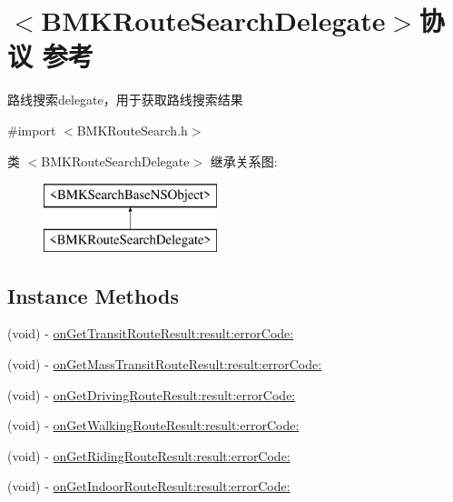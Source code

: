 \hypertarget{protocol_b_m_k_route_search_delegate-p}{}\section{$<$B\+M\+K\+Route\+Search\+Delegate$>$协议 参考}
\label{protocol_b_m_k_route_search_delegate-p}


路线搜索delegate，用于获取路线搜索结果  




{\ttfamily \#import $<$B\+M\+K\+Route\+Search.\+h$>$}

类 $<$B\+M\+K\+Route\+Search\+Delegate$>$ 继承关系图\+:\begin{figure}[H]
\begin{center}
\leavevmode
\includegraphics[height=2.000000cm]{protocol_b_m_k_route_search_delegate-p}
\end{center}
\end{figure}
\subsection*{Instance Methods}
\begin{DoxyCompactItemize}
\item 
(void) -\/ \hyperlink{protocol_b_m_k_route_search_delegate-p_adc734b9f771f0a2f600e0dc9da42fc9b}{on\+Get\+Transit\+Route\+Result\+:result\+:error\+Code\+:}
\item 
(void) -\/ \hyperlink{protocol_b_m_k_route_search_delegate-p_aff740d8b95d84e1e66d7bbf52e7514c7}{on\+Get\+Mass\+Transit\+Route\+Result\+:result\+:error\+Code\+:}
\item 
(void) -\/ \hyperlink{protocol_b_m_k_route_search_delegate-p_ad59fd0b2fd5232e5c8f36a30cc8f842f}{on\+Get\+Driving\+Route\+Result\+:result\+:error\+Code\+:}
\item 
(void) -\/ \hyperlink{protocol_b_m_k_route_search_delegate-p_aad8e804e5ef257146f31e7665a2edafa}{on\+Get\+Walking\+Route\+Result\+:result\+:error\+Code\+:}
\item 
(void) -\/ \hyperlink{protocol_b_m_k_route_search_delegate-p_ac9f166a59d8519a106be7ceaac955266}{on\+Get\+Riding\+Route\+Result\+:result\+:error\+Code\+:}
\item 
(void) -\/ \hyperlink{protocol_b_m_k_route_search_delegate-p_a778eae13daae4ab0c666104daa854dda}{on\+Get\+Indoor\+Route\+Result\+:result\+:error\+Code\+:}
\end{DoxyCompactItemize}


